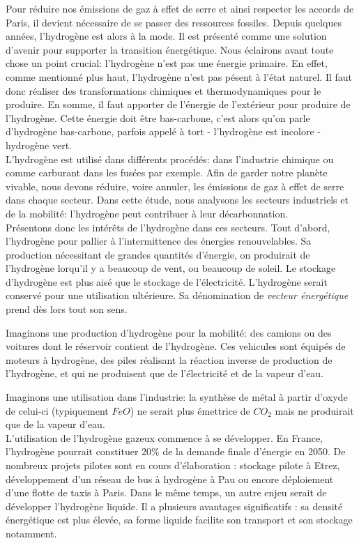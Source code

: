 \documentclass[11pt,french,a4paper]{article}
\begin{document}
Pour réduire nos émissions de gaz à effet de serre et ainsi respecter les accords de Paris, il devient nécessaire de se passer des ressources fossiles. Depuis quelques années, l'hydrogène est alors à la mode. Il est présenté comme une solution d'avenir pour supporter la transition énergétique. Nous éclairons avant toute chose un point crucial: l'hydrogène n'est pas une énergie primaire. En effet, comme mentionné plus haut, l'hydrogène n'est pas pésent à l'état naturel. Il faut donc réaliser des transformations chimiques et thermodynamiques pour le produire. En somme, il faut apporter de l'énergie de l'extérieur pour produire de l'hydrogène. Cette énergie doit être bas-carbone, c'est alors qu'on parle d'hydrogène bas-carbone, parfois appelé à tort - l'hydrogène est incolore - hydrogène vert.  \\

L'hydrogène est utilisé dans différents procédés: dans l'industrie chimique ou comme carburant dans les fusées par exemple. Afin de garder notre planète vivable, nous devons réduire, voire annuler, les émissions de gaz à effet de serre dans chaque secteur. Dans cette étude, nous analysons les secteurs industriels et de la mobilité: l'hydrogène peut contribuer à leur décarbonnation.\\

Présentons donc les intérêts de l'hydrogène dans ces secteurs. Tout d'abord, l'hydrogène pour pallier à l'intermittence des énergies renouvelables. Sa production nécessitant de grandes quantités d'énergie, on produirait de l'hydrogène lorqu'il y a beaucoup de vent, ou beaucoup de soleil. Le stockage d'hydrogène est plus aisé que le stockage de l'électricité. L'hydrogène serait conservé pour une utilisation ultérieure. Sa dénomination de \emph{vecteur énergétique} prend dès lors tout son sens.

 Imaginons une production d'hydrogène pour la mobilité: des camions ou des voitures dont le réservoir contient de l'hydrogène. Ces vehicules sont équipés de moteurs à hydrogène, des piles réalisant la réaction inverse de production de l'hydrogène, et qui ne produisent que de l'électricité et de la vapeur d'eau. 
 
 Imaginons une utilisation dans l'industrie: la synthèse de métal à partir d'oxyde de celui-ci (typiquement $FeO$) ne serait plus émettrice de $CO_2$ mais ne produirait que de la vapeur d'eau. \\
 
L’utilisation de l’hydrogène gazeux commence à se développer. En France, l’hydrogène pourrait constituer 20\% de la demande finale d’énergie en 2050. De nombreux projets pilotes sont en cours d’élaboration : stockage pilote à Etrez, développement d’un réseau de bus à hydrogène à Pau ou encore déploiement d’une flotte de taxis à Paris. Dans le même temps, un autre enjeu serait de développer l’hydrogène liquide. Il a plusieurs avantages significatifs : sa densité énergétique est plus élevée, sa forme liquide facilite son transport et son stockage notamment.
\end{document}
